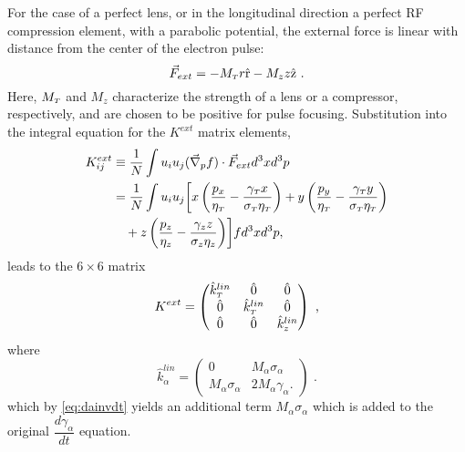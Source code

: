 For the case of a perfect lens, or in the longitudinal direction a perfect RF compression element, with a parabolic potential, the external force is linear with distance from the center of the electron pulse: 
\begin{equation} \label{eq:linear_force}
\vec{F}_{ext} = - M_{ {\scriptscriptstyle T} } r \hat{\operatorname{r}} - M_{z} z \hat{\operatorname{z}} \text{ .}
\end{equation}
Here, $M_{ {\scriptscriptstyle T} }$ and $M_{z}$ characterize the strength of a lens or a compressor, respectively, and are chosen to be positive for pulse focusing. Substitution into the integral equation for the $ K^{ext} $ matrix elements,
\begin{equation}
 \begin{split} 
  K^{ext}_{ij} & \equiv \dfrac{1} {N} \int u_{i} u_{j} ( \vec{\nabla}_{p} f ) \cdot \vec{F}_{ext} d^{3} x d^{3} p \\ & = \dfrac{1} {N} \int u_{i} u_{j} \biggl[ x \left( \dfrac{ p_{x} } { \eta_{ {\scriptscriptstyle T} } } - \dfrac{ \gamma_{ {\scriptscriptstyle T} } x } { \sigma_{ {\scriptscriptstyle T} } \eta_{ {\scriptscriptstyle T} } } \right) + y \left( \dfrac{ p_{y} } { \eta_{ {\scriptscriptstyle T} } } - \dfrac{ \gamma_{ {\scriptscriptstyle T} } y } { \sigma_{ {\scriptscriptstyle T} } \eta_{ {\scriptscriptstyle T} } } \right) \\ & \quad + z \left( \dfrac{ p_{z} } { \eta_{z} } - \dfrac{ \gamma_{z} z } { \sigma_{z} \eta_{z} } \right) \biggr] f d^{3} x d^{3} p ,
 \end{split}
\end{equation}
leads to the $6\times6$ matrix
\begin{equation}
K^{ext} = 
\begin{pmatrix}
\hat{k}^{lin}_{{\scriptscriptstyle T}} & \hat{0} & \hat{0} \\
\hat{0} & \hat{k}^{lin}_{{\scriptscriptstyle T}} & \hat{0} \\
\hat{0} & \hat{0} & \hat{k}^{lin}_{z}
\end{pmatrix} \text{ ,}
\end{equation}
where
\begin{equation}
\hat{k}^{lin}_{\alpha} =
\begin{pmatrix}
0 & M_{\alpha} \sigma_{\alpha} \\
M_{\alpha} \sigma_{\alpha} & 2 M_{\alpha} \gamma_{\alpha} \text{.}
\end{pmatrix} \text{ .}
\end{equation}
which by \ref{eq:dainvdt} yields an additional term $M_{\alpha} \sigma_{\alpha}$ which is added to the original $\dfrac{d \gamma_{\alpha}}{d t}$ equation.

